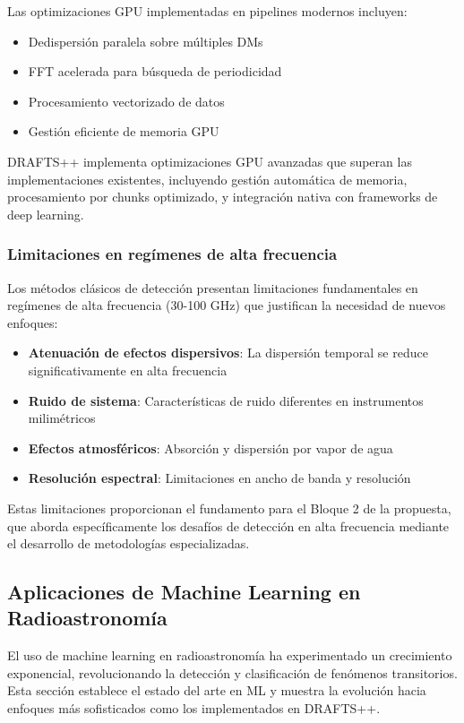 Las optimizaciones GPU implementadas en pipelines modernos incluyen:
\begin{itemize}
    \item Dedispersión paralela sobre múltiples DMs
    \item FFT acelerada para búsqueda de periodicidad
    \item Procesamiento vectorizado de datos
    \item Gestión eficiente de memoria GPU
\end{itemize}

DRAFTS++ implementa optimizaciones GPU avanzadas que superan las implementaciones existentes, incluyendo gestión automática de memoria, procesamiento por chunks optimizado, y integración nativa con frameworks de deep learning.

\subsubsection{Limitaciones en regímenes de alta frecuencia}

Los métodos clásicos de detección presentan limitaciones fundamentales en regímenes de alta frecuencia (30-100 GHz) que justifican la necesidad de nuevos enfoques:

\begin{itemize}
    \item \textbf{Atenuación de efectos dispersivos}: La dispersión temporal se reduce significativamente en alta frecuencia
    \item \textbf{Ruido de sistema}: Características de ruido diferentes en instrumentos milimétricos
    \item \textbf{Efectos atmosféricos}: Absorción y dispersión por vapor de agua
    \item \textbf{Resolución espectral}: Limitaciones en ancho de banda y resolución
\end{itemize}

Estas limitaciones proporcionan el fundamento para el Bloque 2 de la propuesta, que aborda específicamente los desafíos de detección en alta frecuencia mediante el desarrollo de metodologías especializadas.

\subsection{Aplicaciones de Machine Learning en Radioastronomía}

El uso de machine learning en radioastronomía ha experimentado un crecimiento exponencial, revolucionando la detección y clasificación de fenómenos transitorios. Esta sección establece el estado del arte en ML y muestra la evolución hacia enfoques más sofisticados como los implementados en DRAFTS++.

